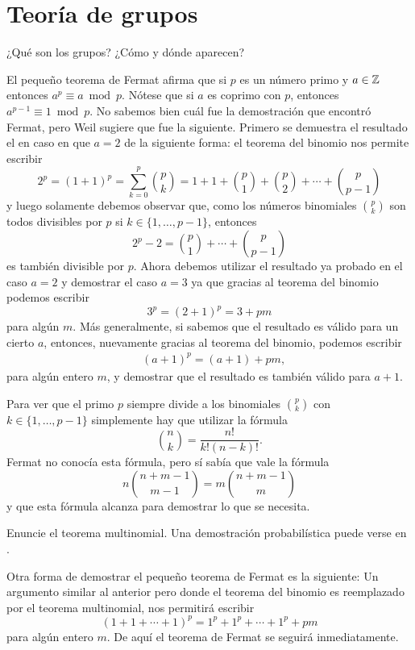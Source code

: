 \chapter{Teoría de grupos}

¿Qué son los grupos? ¿Cómo y dónde aparecen? 

El pequeño teorema de Fermat afirma que si $p$ es un número primo y $a\in\mathbb{Z}$ 
entonces $a^p\equiv a\bmod p$. Nótese que si $a$ 
es
coprimo con $p$, entonces $a^{p-1}\equiv 1\bmod p$. No sabemos bien cuál fue la
demostración que encontró Fermat, pero Weil sugiere que fue la siguiente.
Primero se demuestra el resultado el en caso en que $a=2$ de la siguiente
forma: el teorema del binomio nos permite escribir
\[
	2^p=(1+1)^p=\sum_{k=0}^p\binom{p}{k}=1+1+\binom{p}{1}+\binom{p}{2}+\cdots+\binom{p}{p-1}
\]
y luego solamente debemos observar que, como los números binomiales
$\binom{p}{k}$ son todos divisibles por $p$ si $k\in\{1,\dots,p-1\}$, entonces
\[
	2^p-2=\binom{p}{1}+\cdots+\binom{p}{p-1}
\]
es también divisible por $p$. 
Ahora debemos utilizar el resultado ya probado en el caso $a=2$
y demostrar el caso $a=3$ ya que gracias al teorema del binomio podemos
escribir 
\[
	3^p=(2+1)^p=3+pm
\]
para algún $m$. Más generalmente, si sabemos que el resultado es válido para un
cierto $a$, entonces, nuevamente gracias al teorema del binomio, podemos
escribir 
\begin{align*}
	&(a+1)^p = (a+1)+pm,
\end{align*}
para algún entero $m$, y demostrar que el resultado es también válido para
$a+1$. 

Para ver que el primo $p$ siempre divide a los binomiales $\binom{p}{k}$ con $k\in\{1,\dots,p-1\}$ 
simplemente hay que utilizar la fórmula
\[
	\binom{n}{k}=\frac{n!}{k!(n-k)!}.
\]
Fermat no conocía esta fórmula, pero sí sabía que vale la fórmula
\[
	n\binom{n+m-1}{m-1}=m\binom{n+m-1}{m}
\]
y que esta fórmula alcanza para demostrar lo que se necesita.

\begin{exercise}
	Enuncie el teorema multinomial. Una demostración
	probabilística puede verse en \cite{MR3453544}.
\end{exercise}

Otra forma de demostrar el pequeño teorema de Fermat es la siguiente:  
Un argumento similar al anterior pero donde el teorema del
binomio es reemplazado por el teorema multinomial, nos permitirá escribir 
\[
	(1+1+\cdots+1)^p=1^p+1^p+\cdots+1^p+pm
\]
para algún entero $m$. De aquí el teorema de Fermat se seguirá
inmediatamente. 


